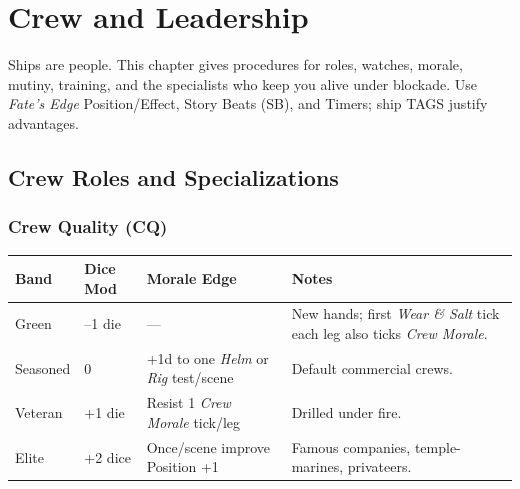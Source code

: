 \documentclass[11pt,oneside]{book}
\begin{document}
\chapter{Crew and Leadership}

\noindent Ships are people. This chapter gives procedures for roles, watches, morale, mutiny, training, and the specialists who keep you alive under blockade. Use \textit{Fate's Edge} Position/Effect, Story Beats (SB), and Timers; ship TAGS justify advantages.

\section{Crew Roles and Specializations}

\subsection*{Crew Quality (CQ)}
\begin{tabularx}{\linewidth}{@{}p{2.4cm} p{2.2cm} p{2.2cm} X@{}}
\toprule
\textbf{Band} & \textbf{Dice Mod} & \textbf{Morale Edge} & \textbf{Notes}\\
\midrule
Green & --1 die & --- & New hands; first \textit{Wear \& Salt} tick each leg also ticks \textit{Crew Morale}.\\
Seasoned & 0 & +1d to one \emph{Helm} or \emph{Rig} test/scene & Default commercial crews.\\
Veteran & +1 die & Resist 1 \textit{Crew Morale} tick/leg & Drilled under fire.\\
Elite & +2 dice & Once/scene improve Position +1 & Famous companies, temple-marines, privateers.\\
\bottomrule
\end{tabularx}
\end{document}
